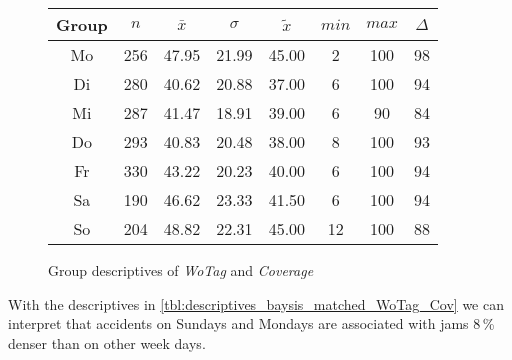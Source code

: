 \begin{figure}[ht!]
	\centering
	\begin{minipage}{0.5\textwidth}
		\tiny
		\setlength{\tabcolsep}{4pt}
		\centering
		\begin{tabular}{c|c|c|c|c|c|c|c}
			\toprule
			Group & $n$ & $\bar{x}$ & $\sigma$ & $\tilde{x}$ & $min$ & $max$ & $\Delta$ \\
			\midrule
			Mo & 256 & 47.95 & 21.99 & 45.00 & 2  & 100 & 98 \\ 
			Di & 280 & 40.62 & 20.88 & 37.00 & 6  & 100 & 94 \\ 
			Mi & 287 & 41.47 & 18.91 & 39.00 & 6  & 90  & 84 \\ 
			Do & 293 & 40.83 & 20.48 & 38.00 & 8  & 100 & 93 \\ 
			Fr & 330 & 43.22 & 20.23 & 40.00 & 6  & 100 & 94 \\ 
			Sa & 190 & 46.62 & 23.33 & 41.50 & 6  & 100 & 94 \\ 
			So & 204 & 48.82 & 22.31 & 45.00 & 12 & 100 & 88 \\ 
			\bottomrule
		\end{tabular}
		\label{tbl:descriptives_baysis_matched_WoTag_Cov}
	\end{minipage}%
	\begin{minipage}{0.55\textwidth}
		\data 
        \pgfplotstablesort[sort key=mean, sort cmp=float >]{\datasorted}{\data}
        \tiny
        \centering
		\label{fig:descriptives_baysis_matched_WoTag_Cov}
	\end{minipage}%
	\caption{Group descriptives of \textit{WoTag} and \textit{Coverage}}
\end{figure}
With the descriptives in \cref{tbl:descriptives_baysis_matched_WoTag_Cov} we can interpret that accidents on Sundays and Mondays are associated with jams 8\,\% denser than on other week days.

